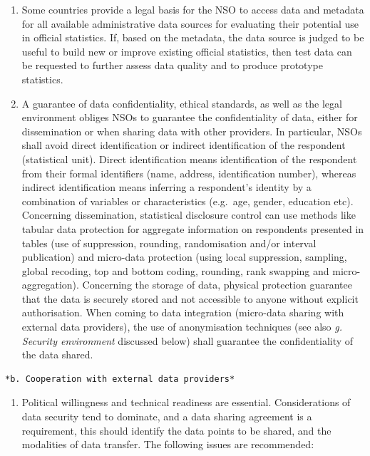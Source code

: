 \documentclass[
]{article}
\providecommand{\tightlist}{%
  \setlength{\itemsep}{0pt}\setlength{\parskip}{0pt}}
\begin{document}
\begin{enumerate}
\def\labelenumi{\arabic{enumi}.}
\setcounter{enumi}{204}
\item
  Some countries provide a legal basis for the NSO to access data and
  metadata for all available administrative data sources for
  evaluating their potential use in official statistics. If, based on
  the metadata, the data source is judged to be useful to build new or
  improve existing official statistics, then test data can be
  requested to further assess data quality and to produce prototype
  statistics.
\item
  A guarantee of data confidentiality, ethical standards, as well as
  the legal environment obliges NSOs to guarantee the confidentiality
  of data, either for dissemination or when sharing data with other
  providers. In particular, NSOs shall avoid direct identification or
  indirect identification of the respondent (statistical unit). Direct
  identification means identification of the respondent from their
  formal identifiers (name, address, identification number), whereas
  indirect identification means inferring a respondent's identity by
  a combination of variables or characteristics (e.g.~age, gender,
  education etc). Concerning dissemination, statistical disclosure
  control can use methods like tabular data protection for aggregate
  information on respondents presented in tables (use of suppression,
  rounding, randomisation and/or interval publication) and micro-data
  protection (using local suppression, sampling, global recoding, top
  and bottom coding, rounding, rank swapping and micro-aggregation).
  Concerning the storage of data, physical protection guarantee that
  the data is securely stored and not accessible to anyone without
  explicit authorisation. When coming to data integration (micro-data
  sharing with external data providers), the use of anonymisation
  techniques (see also \emph{g. Security environment} discussed below)
  shall guarantee the confidentiality of the data shared.
\end{enumerate}

\begin{verbatim}
*b. Cooperation with external data providers*
\end{verbatim}

\begin{enumerate}
\def\labelenumi{\arabic{enumi}.}
\setcounter{enumi}{206}
\tightlist
\item
  Political willingness and technical readiness are essential.
  Considerations of data security tend to dominate, and a data sharing
  agreement is a requirement, this should identify the data points to
  be shared, and the modalities of data transfer. The following issues
  are recommended:
\end{enumerate}
\end{document}
